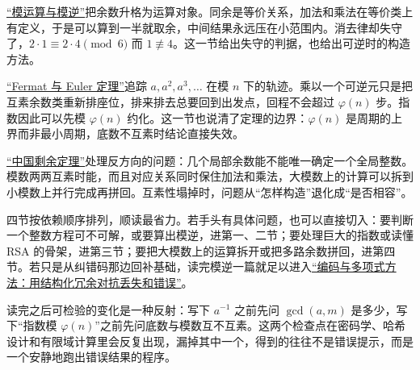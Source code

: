 \hyperref[sec:04-Discrete-Mathematics/04-Number-Theory/02]{``模运算与模逆''}把余数升格为运算对象。同余是等价关系，加法和乘法在等价类上有定义，于是可以算到一半就取余，中间结果永远压在小范围内。消去律却失守了，\(2\cdot1\equiv2\cdot4\pmod 6\) 而 \(1\not\equiv4\)。这一节给出失守的判据，也给出可逆时的构造方法。

\hyperref[sec:04-Discrete-Mathematics/04-Number-Theory/03]{``Fermat 与 Euler 定理''}追踪 \(a,a^2,a^3,\dots\) 在模 \(n\) 下的轨迹。乘以一个可逆元只是把互素余数类重新排座位，排来排去总要回到出发点，回程不会超过 \(\varphi(n)\) 步。指数因此可以先模 \(\varphi(n)\) 约化。这一节也说清了定理的边界：\(\varphi(n)\) 是周期的上界而非最小周期，底数不互素时结论直接失效。

\hyperref[sec:04-Discrete-Mathematics/04-Number-Theory/04]{``中国剩余定理''}处理反方向的问题：几个局部余数能不能唯一确定一个全局整数。模数两两互素时能，而且对应关系同时保住加法和乘法，大模数上的计算可以拆到小模数上并行完成再拼回。互素性塌掉时，问题从``怎样构造''退化成``是否相容''。

四节按依赖顺序排列，顺读最省力。若手头有具体问题，也可以直接切入：要判断一个整数方程可不可解，或要算出模逆，进第一、二节；要处理巨大的指数或读懂 RSA 的骨架，进第三节；要把大模数上的运算拆开或把多路余数拼回，进第四节。若只是从纠错码那边回补基础，读完模逆一篇就足以进入\hyperref[ch:031]{``编码与多项式方法：用结构化冗余对抗丢失和错误''}。

读完之后可检验的变化是一种反射：写下 \(a^{-1}\) 之前先问 \(\gcd(a,m)\) 是多少，写下``指数模 \(\varphi(n)\)''之前先问底数与模数互不互素。这两个检查点在密码学、哈希设计和有限域计算里会反复出现，漏掉其中一个，得到的往往不是错误提示，而是一个安静地跑出错误结果的程序。
